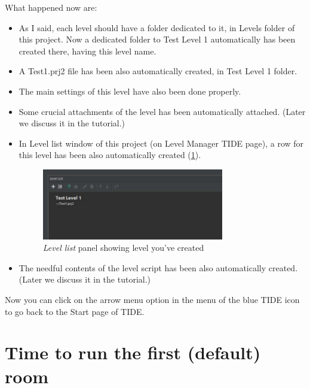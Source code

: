 What happened now are:
\begin{itemize}
    \item As I said, each level should have a folder dedicated to it, in Levels folder of this project. Now a dedicated folder to Test Level 1 automatically has been created there, having this level name.
    \item A Test1.prj2 file has been also automatically created, in Test Level 1 folder.
    \item The main settings of this level have also been done properly.
    \item Some crucial attachments of the level has been automatically attached. (Later we discuss it in the tutorial.)
    \item In Level list window of this project (on Level Manager TIDE page), a row for this level has been also automatically created (\ref{fig:tide8}).
    
\begin{figure}
    \centering
     \includegraphics[width=0.75\textwidth]{screenshots/8.jpg}
     \caption{\emph{Level list} panel showing level you've created}
     \label{fig:tide8}
\end{figure}

    \item The needful contents of the level script has been also automatically created. (Later we discuss it in the tutorial.)

\end{itemize}
Now you can click on the arrow menu option in the menu of the blue TIDE icon to go back to the Start page of TIDE.

\chapter{Time to run the first (default) room}

